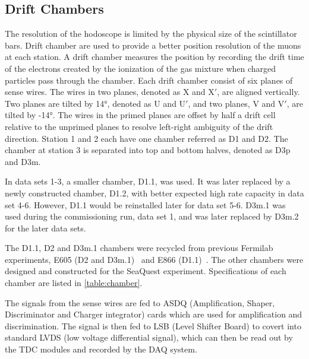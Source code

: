\documentclass[../main.tex]{subfiles}
\begin{document}
\subsection{Drift Chambers}
The resolution of the hodoscope is limited by the physical size of the scintillator bars.
Drift chamber are used to provide a better position resolution of the muons at each station.
A drift chamber measures the position by recording the drift time of the electrons created
by the ionization of the gas mixture when charged particles pass through the chamber.
Each drift chamber consist of six planes of sense wires. The wires in two planes,
denoted as X and X$'$, are aligned vertically. Two planes are tilted by \ang[retain-explicit-plus]{+14},
denoted as U and U$'$, and two planes, V and V$'$, are tilted by \ang[retain-explicit-plus]{-14}.
The wires in the primed planes are offset by half a drift cell relative to the
unprimed planes to resolve left-right ambiguity of the drift direction.
Station 1 and 2 each have one chamber referred as D1 and D2. The chamber at station
3 is separated into top and bottom halves, denoted as D3p and D3m.

In data sets 1-3, a smaller chamber, D1.1, was used. It was later replaced by a newly constructed
chamber, D1.2, with better expected high rate capacity in data set 4-6. However, D1.1 would be
reinstalled later for data set 5-6. D3m.1 was used during the commissioning run, data set 1, and
was later replaced by D3m.2 for the later data sets.

The D1.1, D2 and D3m.1 chambers were recycled from previous Fermilab experiments, E605 (D2 and D3m.1)~\cite{moreno1991}
and E866 (D1.1)~\cite{hawker1998}. The other chambers were designed and constructed for the SeaQuest experiment.
Specifications of each chamber are listed in \cref{table:chamber}.

The signals from the sense wires are fed to ASDQ (Amplification, Shaper, Discriminator and Charger integrator)
cards which are used for amplification and discrimination. The signal is then fed to LSB (Level Shifter Board)
to covert into standard LVDS (low voltage differential signal), which can then be read out by the TDC
modules and recorded by the DAQ system.
\end{document}
